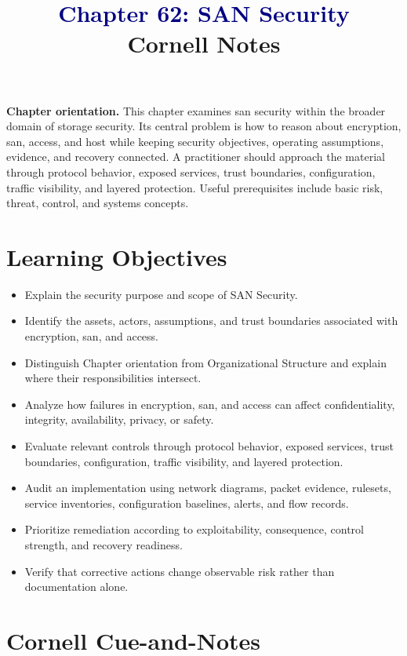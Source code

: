 \documentclass[11pt]{article}
\title{\textcolor{Navy}{Chapter 62: SAN Security}\\[2mm]\large Cornell Notes}
\author{}
\date{}
\begin{document}
\maketitle
\thispagestyle{fancy}
\vspace{-1.5em}
\begin{orientationbox}
\textbf{Chapter orientation.} This chapter examines san security within the broader domain of storage security. Its central problem is how to reason about encryption, san, access, and host while keeping security objectives, operating assumptions, evidence, and recovery connected. A practitioner should approach the material through protocol behavior, exposed services, trust boundaries, configuration, traffic visibility, and layered protection. Useful prerequisites include basic risk, threat, control, and systems concepts.
\end{orientationbox}
\section*{Learning Objectives}
\begin{itemize}
\item Explain the security purpose and scope of SAN Security.
\item Identify the assets, actors, assumptions, and trust boundaries associated with encryption, san, and access.
\item Distinguish Chapter orientation from Organizational Structure and explain where their responsibilities intersect.
\item Analyze how failures in encryption, san, and access can affect confidentiality, integrity, availability, privacy, or safety.
\item Evaluate relevant controls through protocol behavior, exposed services, trust boundaries, configuration, traffic visibility, and layered protection.
\item Audit an implementation using network diagrams, packet evidence, rulesets, service inventories, configuration baselines, alerts, and flow records.
\item Prioritize remediation according to exploitability, consequence, control strength, and recovery readiness.
\item Verify that corrective actions change observable risk rather than documentation alone.
\end{itemize}
\section*{Cornell Cue-and-Notes}
\end{document}
